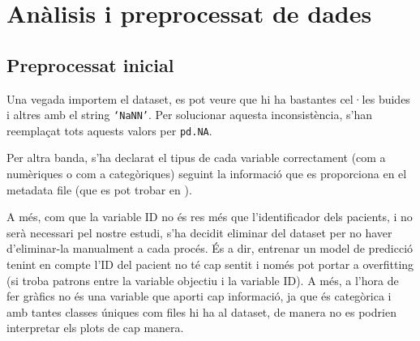 \section{Anàlisis i preprocessat de dades}

\subsection{Preprocessat inicial}
Una vegada importem el dataset, es pot veure que hi ha bastantes cel·les buides i altres amb el string \texttt{`NaNN'}. Per solucionar aquesta inconsistència, s'han reemplaçat tots aquests valors per \texttt{pd.NA}.

Per altra banda, s'ha declarat el tipus de cada variable correctament (com a numèriques o com a categòriques) seguint la informació que es proporciona en el metadata file (que es pot trobar en \cite{misc_cirrhosis_patient_survival_prediction_878}).

A més, com que la variable ID no és res més que l'identificador dels pacients, i no serà necessari pel nostre estudi, s'ha decidit eliminar del dataset per no haver d'eliminar-la manualment a cada procés. És a dir, entrenar un model de predicció tenint en compte l'ID del pacient no té cap sentit i només pot portar a overfitting (si troba patrons entre la variable objectiu i la variable ID). A més, a l'hora de fer gràfics no és una variable que aporti cap informació, ja que és categòrica i amb tantes classes úniques com files hi ha al dataset, de manera no es podrien interpretar els plots de cap manera.


